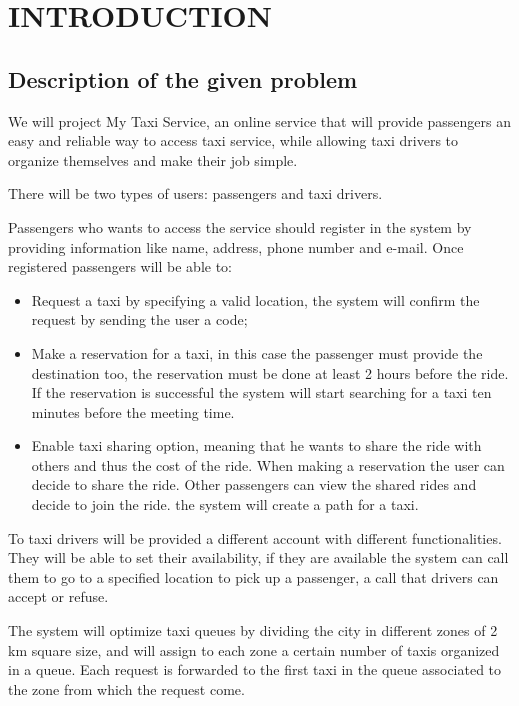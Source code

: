 
\section{INTRODUCTION}
\subsection{Description of the given problem}

We will project My Taxi Service, an online service that will provide passengers an easy and reliable way to access taxi service, while allowing taxi drivers to organize themselves and make their job simple.

There will be two types of users: passengers and taxi drivers.

Passengers who wants to access the service should register in the system by providing information like name, address, phone number and e-mail. 
Once registered passengers will be able to: 
\begin{itemize}
	\item Request a taxi by specifying a valid location, the system will confirm the request by sending the user a code;
	\item Make a reservation for a taxi, in this case the passenger must provide the destination too, the reservation must be done at least 2 hours before the ride. If the reservation is successful the system will start searching for a taxi ten minutes before the meeting time.
	\item Enable taxi sharing option, meaning that he wants to share the ride with others and thus the cost of the ride. When making a reservation the user can decide to share the ride. Other passengers can view the shared rides and decide to join the ride. the system will create a path for a taxi.
\end{itemize}

To taxi drivers will be provided a different account with different functionalities. They will be able to set their availability, if they are available the system can call them to go to a specified location to pick up a passenger, a call that drivers can accept or refuse.

The system will optimize taxi queues by dividing the city in different zones of 2 km square size, and will assign to each zone a certain number of taxis organized in a queue. Each request is forwarded to the first taxi in the queue associated to the zone from which the request come.

